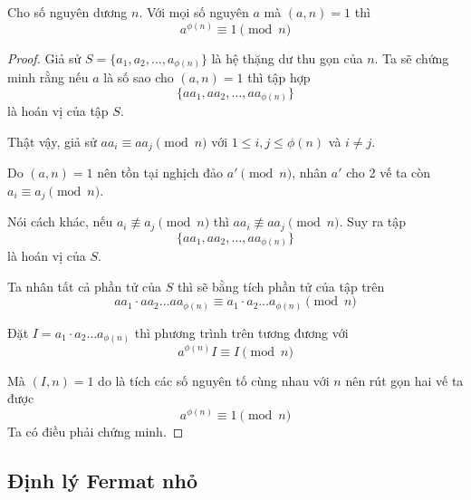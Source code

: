 \begin{theorem}    
    Cho số nguyên dương $n$. Với mọi số nguyên $a$ mà $(a, n) = 1$ thì 
    \begin{equation}
        a^{\phi(n)} \equiv 1 \pmod n
    \end{equation}
\end{theorem}

\begin{proof}
    Giả sử $S = \{a_1, a_2, \ldots, a_{\phi(n)}\}$ là hệ thặng dư thu gọn của $n$. Ta sẽ chứng minh rằng nếu $a$ là số sao cho $(a, n)=1$ thì tập hợp
    \begin{equation*}
        \{a a_1, a a_2, \ldots, a a_{\phi(n)}\}
    \end{equation*}
    là hoán vị của tập $S$.

    Thật vậy, giả sử $a a_i \equiv a a_j \pmod n$ với $1 \leqslant i, j \leqslant \phi(n)$ và $i \neq j$.

    Do $(a, n) = 1$ nên tồn tại nghịch đảo $a' \pmod n$, nhân $a'$ cho 2 vế ta còn $a_i \equiv a_j \pmod n$.

    Nói cách khác, nếu $a_i \not\equiv a_j \pmod n$ thì $a a_i \not\equiv a a_j \pmod n$. Suy ra tập
    \begin{equation*}
        \{a a_1, a a_2, \ldots, a a_{\phi(n)}\}
    \end{equation*}
    là hoán vị của $S$.

    Ta nhân tất cả phần tử của $S$ thì sẽ bằng tích phần tử của tập trên
    \begin{equation*}
        a a_1 \cdot a a_2 \ldots a a_{\phi(n)} \equiv a_1 \cdot a_2 \ldots a_{\phi(n)} \pmod n
    \end{equation*}

    Đặt $I = a_1 \cdot a_2 \ldots a_{\phi(n)}$ thì phương trình trên tương đương với 
    \begin{equation*}
        a^{\phi(n)} I \equiv I \pmod n
    \end{equation*}
    
    Mà $(I, n) = 1$ do là tích các số nguyên tố cùng nhau với $n$ nên rút gọn hai vế ta được
    \begin{equation*}
        a^{\phi(n)} \equiv 1 \pmod n
    \end{equation*}
    Ta có điều phải chứng minh.
\end{proof}

\subsection*{Định lý Fermat nhỏ}

